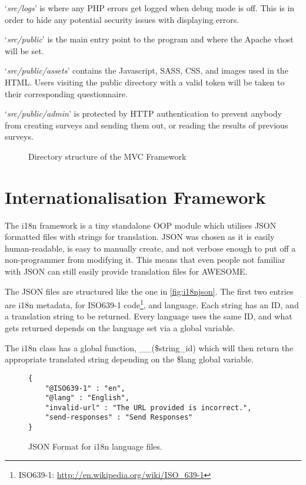 	`\textit{src/logs}' is where any PHP errors get logged when debug mode is off. This is in order to hide any potential security issues with displaying errors.
	
	`\textit{src/public}' is the main entry point to the program and where the Apache vhost will be set.
	
	`\textit{src/public/assets}' contains the Javascript, SASS, CSS, and images used in the HTML.
	Users visiting the public directory with a valid token will be taken to their corresponding questionnaire.
	
	`\textit{src/public/admin}' is protected by HTTP authentication to prevent anybody from creating surveys and sending them out, or reading the results of previous surveys.
	
	\begin{figure}[H]
		\caption{Directory structure of the \acs{MVC} Framework}
		\label{fig:mvcdirtree}
	\end{figure}
	
	\section{Internationalisation Framework}
	\label{sec:i18nframework}
	
	The \ac{i18n} framework is a tiny standalone \ac{OOP} module which utilises JSON formatted files with strings for translation.
	JSON was chosen as it is easily human-readable, is easy to manually create, and not verbose enough to put off a non-programmer from modifying it.
	This means that even people not familiar with JSON can still easily provide translation files for \ac{AWESOME}.
	
	The JSON files are structured like the one in \autoref{fig:i18njson}. The first two entries are \ac{i18n} metadata, for ISO639-1 code\footnote{ISO639-1: \url{http://en.wikipedia.org/wiki/ISO_639-1}}, and language.
	Each string has an ID, and a translation string to be returned.
	Every language uses the same ID, and what gets returned depends on the language set via a global variable.
	
	The \ac{i18n} class has a global function, \_\_(\$string\_id) which will then return the appropriate translated string depending on the \$lang global variable.
	
	\begin{figure}[H]
		\begin{verbatim}
{
    "@ISO639-1" : "en",
    "@lang" : "English",
    "invalid-url" : "The URL provided is incorrect.",
    "send-responses" : "Send Responses"
}
		\end{verbatim}
		\caption{JSON Format for \ac{i18n} language files.}
		\label{fig:i18njson}
	\end{figure}
	
